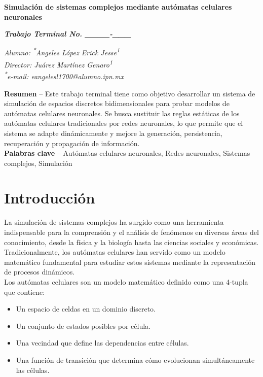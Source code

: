 \documentclass[letterpaper,10pt,oneside]{article}
\newcommand\authormark[1]{\textsuperscript{#1}}
\begin{document}
	\begin{center}
		\fontsize{14}{16}\selectfont\bfseries
		Simulación de sistemas complejos mediante autómatas celulares neuronales
	\end{center}
	
	\begin{center}
		\fontsize{14}{16}\selectfont\bfseries
		\textit{Trabajo Terminal No. \_\_\_\_-\_\_\_}
	\end{center}
	
	\begin{center}
		\fontsize{12}{16}\selectfont
		\textit{Alumno: \authormark{*}Angeles López Erick Jesse\authormark{1}} \\
		\textit{Director: Juárez Martínez Genaro\authormark{1}} \\
		\textit{\authormark{*}e-mail: eangelesl1700@alumno.ipn.mx}
	\end{center}
	
	\textbf{Resumen} -- Este trabajo terminal tiene como objetivo desarrollar un sistema de simulación de espacios discretos bidimensionales para probar modelos de autómatas celulares neuronales. Se busca sustituir las reglas estáticas de los autómatas celulares tradicionales por redes neuronales, lo que permite que el sistema se adapte dinámicamente y mejore la generación, persistencia, recuperación y propagación de información. \\
	
	\textbf{Palabras clave} -- Autómatas celulares neuronales, Redes neuronales, Sistemas complejos, Simulación
	
	\section{Introducción}
	
	La simulación de sistemas complejos ha surgido como una herramienta indispensable para la comprensión y el análisis de fenómenos en diversas áreas del conocimiento, desde la física y la biología hasta las ciencias sociales y económicas. Tradicionalmente, los autómatas celulares han servido como un modelo matemático fundamental para estudiar estos sistemas mediante la representación de procesos dinámicos. \\
	
	Los autómatas celulares son un modelo matemático definido como una 4-tupla que contiene: 
	\begin{itemize}
		\item Un espacio de celdas en un dominio discreto.
		\item Un conjunto de estados posibles por célula.
		\item Una vecindad que define las dependencias entre células.
		\item Una función de transición que determina cómo evolucionan simultáneamente las células\cite{wolframCA, ZenilMartinez2024}. \\
	\end{itemize}
	
\end{document}
